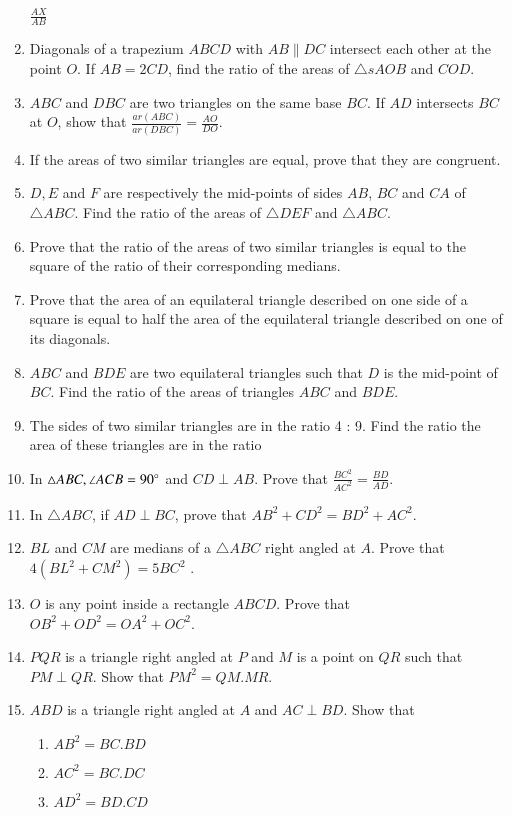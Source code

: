 \begin{enumerate}[label=\arabic*.,ref=\thesubsection.\theenumi]
$\frac{AX}{ AB}$
% 
\item  Diagonals of a trapezium $ABCD$ with $AB  \parallel  DC$ intersect each other at the point $O$. If $AB = 2 CD$, find the ratio of the areas of $\triangle s AOB$ and $COD$.
\item  $ABC$ and $DBC$ are two triangles on the same base $BC$. If $AD$ intersects $BC$ at $O$, show that
$\frac{ar (ABC)}{ ar (DBC)}=\frac{AO}{  DO}$.
\item  If the areas of two similar triangles are equal, prove that they are congruent.
\item  $D, E$ and $F$ are respectively the mid-points of sides $AB$, $BC$ and $CA$ of  $\triangle  ABC$. Find the ratio of the areas of  $\triangle  DEF$ and  $\triangle  ABC$.
\item  Prove that the ratio of the areas of two similar triangles is equal to the square of the ratio of their corresponding medians.
\item  Prove that the area of an equilateral triangle described on one side of a square is equal to half the area of the equilateral triangle described on one of its diagonals.
\item $ABC$ and $BDE$ are two equilateral triangles such that $D$ is the mid-point of $BC$. Find the ratio of the areas of triangles $ABC$ and $BDE$.
\item The sides of two similar triangles are in the ratio 4 : 9. Find the ratio the area of  these triangles are in the ratio
\item In $\triangle ABC, \angle  ACB = 90\degree$ and $CD  \perp  AB$. Prove that 
$\frac{BC^2}{AC^2} = \frac{BD}{ AD}$.
\item In $\triangle ABC$,  if $AD  \perp  BC$, prove that $AB^2+ CD^2 = BD^2 + AC^2$.
\item $BL$ and $CM$ are medians of a $\triangle ABC$ right angled at $A$. Prove that $4 (BL^2 + CM^2
) = 5 BC^2$ .
\item $O$ is any point inside a rectangle $ABCD$. Prove that $OB^2+OD^2 = OA^2+OC^2$.
\item  $PQR$ is a triangle right angled at $P$ and $M$ is a point on $QR$ such that $PM  \perp  QR$. Show that $PM^2= QM . MR$.
\item  $ABD$ is a triangle right angled at $A$ and $AC \perp  BD$. Show that
\begin{enumerate}
\item  $AB^2 = BC . BD$
\item  $AC^2 = BC . DC$
\item  $AD^2  = BD . CD$

\end{enumerate}
\end{enumerate}
